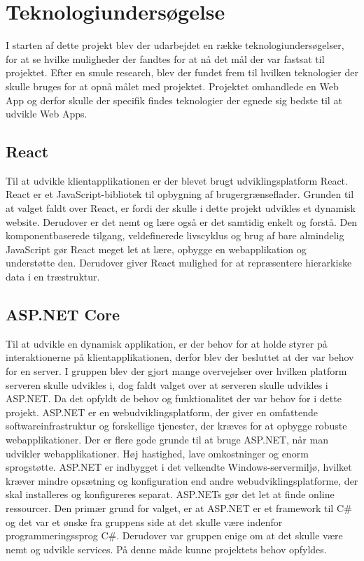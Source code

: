\chapter{Teknologiundersøgelse}

I starten af dette projekt blev der udarbejdet en række teknologiundersøgelser, for at se hvilke muligheder der fandtes for at nå det mål der var fastsat til projektet. Efter en smule research, blev der fundet frem til hvilken teknologier der skulle bruges for at opnå målet med projektet. Projektet omhandlede en Web App og derfor skulle der specifik findes teknologier der egnede sig bedste til at udvikle Web Apps.     

\section{React}

Til at udvikle klientapplikationen er der blevet brugt udviklingsplatform React. React er et JavaScript-bibliotek til opbygning af brugergrænseflader. Grunden til at valget faldt over React, er fordi der skulle i dette projekt udvikles
et dynamisk website. Derudover er det nemt og lære også er det samtidig enkelt og forstå. Den komponentbaserede tilgang, veldefinerede livscyklus og brug af bare almindelig JavaScript gør React meget let at lære, opbygge en webapplikation og understøtte den. Derudover giver React mulighed for at repræsentere hierarkiske data i en træstruktur.

\section{ASP.NET Core}

Til at udvikle en dynamisk applikation, er der behov for at holde styrer på interaktionerne på klientapplikationen, derfor blev der besluttet at der var behov for en server. 
I gruppen blev der gjort mange overvejelser over hvilken platform serveren skulle udvikles i, dog faldt valget over at serveren skulle udvikles i ASP.NET. Da det opfyldt de behov og funktionalitet der var behov for i dette projekt. ASP.NET er en webudviklingsplatform, der giver en omfattende softwareinfrastruktur og forskellige tjenester, der kræves for at opbygge robuste webapplikationer. 
Der er flere gode grunde til at bruge ASP.NET, når man udvikler webapplikationer. Høj hastighed, lave omkostninger og enorm sprogstøtte. ASP.NET er indbygget i det velkendte Windows-servermiljø, hvilket kræver mindre opsætning og konfiguration end andre webudviklingsplatforme, der skal installeres og konfigureres separat. ASP.NETs gør det let at finde online ressourcer. 
Den primær grund for valget, er at ASP.NET er et framework til C\# og det var et ønske fra gruppens side at det skulle være indenfor programmeringssprog C\#. Derudover var gruppen enige om at det skulle være nemt og udvikle services. På denne måde kunne projektets behov opfyldes. 


